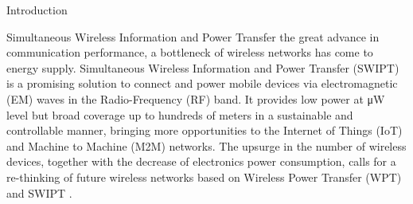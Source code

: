 \documentclass[journal]{IEEEtran}
\begin{document}
	\begin{section}{Introduction}
		\begin{subsection}{Simultaneous Wireless Information and Power Transfer}
			 the great advance in communication performance, a bottleneck of wireless networks has come to energy supply.
			Simultaneous Wireless Information and Power Transfer (SWIPT) is a promising solution to connect and power mobile devices via electromagnetic (EM) waves in the Radio-Frequency (RF) band. It provides low power at \si{\uW} level but broad coverage up to hundreds of meters in a sustainable and controllable manner, bringing more opportunities to the Internet of Things (IoT) and Machine to Machine (M2M) networks. The upsurge in the number of wireless devices, together with the decrease of electronics power consumption, calls for a re-thinking of future wireless networks based on Wireless Power Transfer (WPT) and SWIPT \cite{Clerckx2019}.


\end{subsection}
\end{section}
\end{document}
